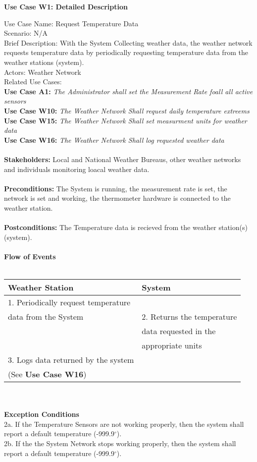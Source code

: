 \documentclass[letterpaper]{article}
\begin{document}
\noindent
\begin{center}
\textbf{Use Case W1:  Detailed Description}
\end{center}
\vspace{4ex}
Use Case Name:  Request Temperature Data\\
Scenario:  N/A\\
Brief Description:  With the System Collecting weather data, the
weather network requests temperature data by periodically requesting
temperature data from the weather stations (system).\\
Actors:  Weather Network\\
Related Use Cases:\\
\textbf{Use Case A1:  }\textit{The Administrator shall set the
Measurement Rate foall all active sensors}\\
\textbf{Use Case W10:  }\textit{The Weather Network Shall request
daily temperature extreems}\\
\textbf{Use Case W15:  }\textit{The Weather Network Shall set
measurment units for weather data}\\
\textbf{Use Case W16:  }\textit{The Weather Network Shall log
requested weather data}\\\\
\textbf{Stakeholders:  }Local and National Weather Bureaus, other
weather networks and individuals monitoring loacal weather data.\\\\
\textbf{Preconditions:  }The System is running, the measurement rate
is set, the network is set and working, the thermometer hardware is
connected to the weather station.\\\\
\textbf{Postconditions:  }The Temperature data is recieved from the
weather station(s) (system).\\\\
\textbf{Flow of Events}\\\\
\begin{tabular}{|l|l|}\hline
\textbf{Weather Station} & \textbf{System}\\\hline
1.  Periodically request temperature & \\
data from the System & 2.  Returns the temperature\\
                     & data requested in the \\
                     & appropriate units\\\hline
3.  Logs data returned by the system & \\
(See \textbf{Use Case W16}) & \\\hline
\end{tabular}\\\\
\textbf{Exception Conditions}\\
2a.  If the Temperature Sensors are not working properly, then the
system shall report a default temperature (-999.9$^\circ$).\\
2b.  If the the System Network stops working properly, then the
system shall report a default temperature (-999.9$^\circ$).
\end{document}

